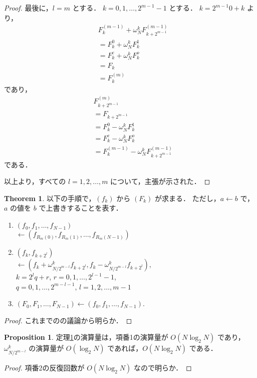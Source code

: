 \documentclass[twocolumn, uplatex, dvipdfmx]{jsarticle}
\numberwithin{equation}{section}
\theoremstyle{definition}
\newtheorem{prop}{Proposition}[section]
\newtheorem{thm}{Theorem}[section]
\begin{document}
\begin{proof}
	最後に，$l=m$ とする．
	$k=0,1,\dots,2^{m-1}-1$ とする．
	$k=2^{m-1}0+k$ より，
	\begin{align*}
		&F_k^{(m-1)}+\omega_N^kF_{k+2^{m-1}}^{(m-1)}\\
		&=F_k^{\mathcal{0}}+\omega_N^kF_k^{\mathcal{1}}\\
		&=F_k^e+\omega_N^kF_k^o\\
		&=F_k\\
		&=F_k^{(m)}
	\end{align*}
	であり，
	\begin{align*}
		&F_{k+2^{m-1}}^{(m)}\\
		&=F_{k+2^{m-1}}\\
		&=F_k^{\mathcal{0}}-\omega_N^kF_k^{\mathcal{1}}\\
		&=F_k^e-\omega_N^kF_k^o\\
		&=F_k^{(m-1)}-\omega_N^kF_{k+2^{m-1}}^{(m-1)}
	\end{align*}
	である．

	以上より，すべての $l=1,2,\dots,m$ について，主張が示された．
\end{proof}

\begin{thm}\label{thm:ntt}
	以下の手順で，$(f_k)$ から $(F_k)$ が求まる．
	ただし，$a\leftarrow b$ で，$a$ の値を $b$ で上書きすることを表す．
	\begin{enumerate}
		\item $(f_0,f_1,\dots,f_{N-1})$\\
			\quad\quad$\leftarrow (f_{R_m(0)},f_{R_m(1)},\dots,f_{R_m(N-1)})$
		\item $(f_k,f_{k+2^l})$\\
			\quad\quad$\leftarrow (f_k+\omega_{N/2^{m-l}}^kf_{k+2^l},f_k-\omega_{N/2^{m-l}}^kf_{k+2^l})$,\\
			$k=2^lq+r$, $r=0,1,\dots,2^{l-1}-1$,\\
			$q=0,1,\dots,2^{m-l-1}$, $l=1,2,\dots,m-1$
		\item $(F_0,F_1,\dots,F_{N-1})\leftarrow (f_0,f_1,\dots,f_{N-1})$.
	\end{enumerate}
\end{thm}
\begin{proof}
	これまでのの議論から明らか．
\end{proof}

\begin{prop}
	定理\ref{thm:ntt}の演算量は，項番1の演算量が $O(N\log_2N)$ であり，$\omega_{N/2^{m-l}}^k$ の演算量が $O(\log_2N)$ であれば，$O(N\log_2N)$ である．
\end{prop}
\begin{proof}
	項番2の反復回数が $O(N\log_2N)$ なので明らか．
\end{proof}
\end{document}
